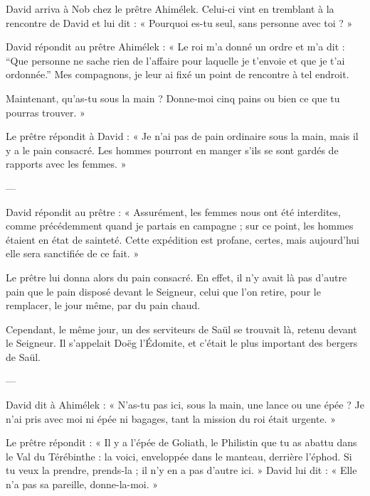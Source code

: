 \documentclass[10pt, twoside, french]{book}
\begin{document}

\vspace{1cm}



David arriva à Nob chez le prêtre Ahimélek. Celui-ci vint en tremblant à la rencontre de David et lui dit : « Pourquoi es-tu seul, sans personne avec toi ? »

David répondit au prêtre Ahimélek : « Le roi m’a donné un ordre et m’a dit : “Que personne ne sache rien de l’affaire pour laquelle je t’envoie et que je t’ai ordonnée.” Mes compagnons, je leur ai fixé un point de rencontre à tel endroit.

Maintenant, qu’as-tu sous la main ? Donne-moi cinq pains ou bien ce que tu pourras trouver. »

Le prêtre répondit à David : « Je n’ai pas de pain ordinaire sous la main, mais il y a le pain consacré. Les hommes pourront en manger s’ils se sont gardés de rapports avec les femmes. »

---

David répondit au prêtre : « Assurément, les femmes nous ont été interdites, comme précédemment quand je partais en campagne ; sur ce point, les hommes étaient en état de sainteté. Cette expédition est profane, certes, mais aujourd’hui elle sera sanctifiée de ce fait. »

Le prêtre lui donna alors du pain consacré. En effet, il n’y avait là pas d’autre pain que le pain disposé devant le Seigneur, celui que l’on retire, pour le remplacer, le jour même, par du pain chaud.

Cependant, le même jour, un des serviteurs de Saül se trouvait là, retenu devant le Seigneur. Il s’appelait Doëg l’Édomite, et c’était le plus important des bergers de Saül.

---

David dit à Ahimélek : « N’as-tu pas ici, sous la main, une lance ou une épée ? Je n’ai pris avec moi ni épée ni bagages, tant la mission du roi était urgente. »

Le prêtre répondit : « Il y a l’épée de Goliath, le Philistin que tu as abattu dans le Val du Térébinthe : la voici, enveloppée dans le manteau, derrière l’éphod. Si tu veux la prendre, prends-la ; il n’y en a pas d’autre ici. » David lui dit : « Elle n’a pas sa pareille, donne-la-moi. »
\end{document}
